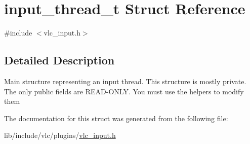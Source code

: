 \hypertarget{structinput__thread__t}{}\section{input\+\_\+thread\+\_\+t Struct Reference}
\label{structinput__thread__t}


{\ttfamily \#include $<$vlc\+\_\+input.\+h$>$}



\subsection{Detailed Description}
Main structure representing an input thread. This structure is mostly private. The only public fields are R\+E\+A\+D-\/\+O\+N\+LY. You must use the helpers to modify them 

The documentation for this struct was generated from the following file\+:\begin{DoxyCompactItemize}
\item 
lib/include/vlc/plugins/\hyperlink{vlc__input_8h}{vlc\+\_\+input.\+h}\end{DoxyCompactItemize}

